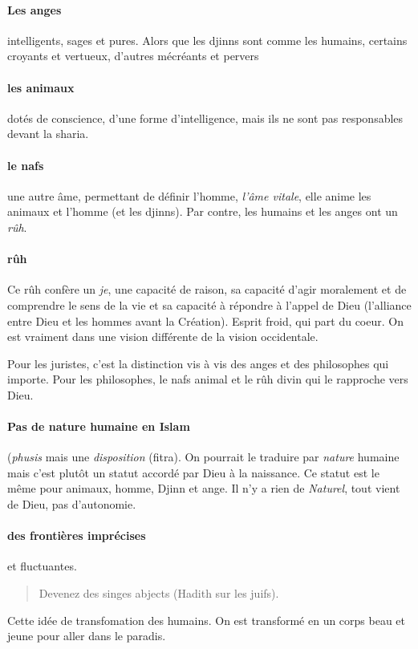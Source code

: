 \paragraph{Les anges} intelligents, sages et pures. Alors que les djinns sont comme les humains, certains croyants et vertueux, d'autres mécréants et pervers

\paragraph{les animaux} dotés de conscience, d'une forme d'intelligence, mais ils ne sont pas responsables devant la sharia. 

\paragraph{le nafs} une autre âme, permettant de définir l'homme, \textit{l'âme vitale}, elle anime les animaux et l'homme (et les djinns). Par contre, les humains et les anges ont un \textit{rûh}.  

\paragraph{rûh} Ce rûh confère un \textit{je}, une capacité de raison, sa capacité d'agir moralement et de comprendre le sens de la vie et sa capacité à répondre à l'appel de Dieu (l'alliance entre Dieu et les hommes avant la Création). Esprit froid,  qui part du coeur. On est vraiment dans une vision différente de la vision occidentale.


Pour les juristes, c'est la distinction vis à vis des anges et des philosophes qui importe. Pour les philosophes, le nafs animal et le rûh divin qui le rapproche vers Dieu.

\paragraph{Pas de nature humaine en Islam } (\textit{phusis} mais une \textit{disposition} (fitra). On pourrait le traduire par \textit{nature} humaine mais c'est plutôt un statut accordé par Dieu à la naissance. Ce statut est le même pour animaux, homme, Djinn et ange. Il n'y a rien de \textit{Naturel}, tout vient de Dieu, pas d'autonomie.

\paragraph{des frontières imprécises} et fluctuantes. 
\begin{quote}
Devenez des singes abjects (Hadith sur les juifs).
\end{quote}
Cette idée de transfomation des humains.
On est transformé en un corps beau et jeune pour aller dans le paradis.












